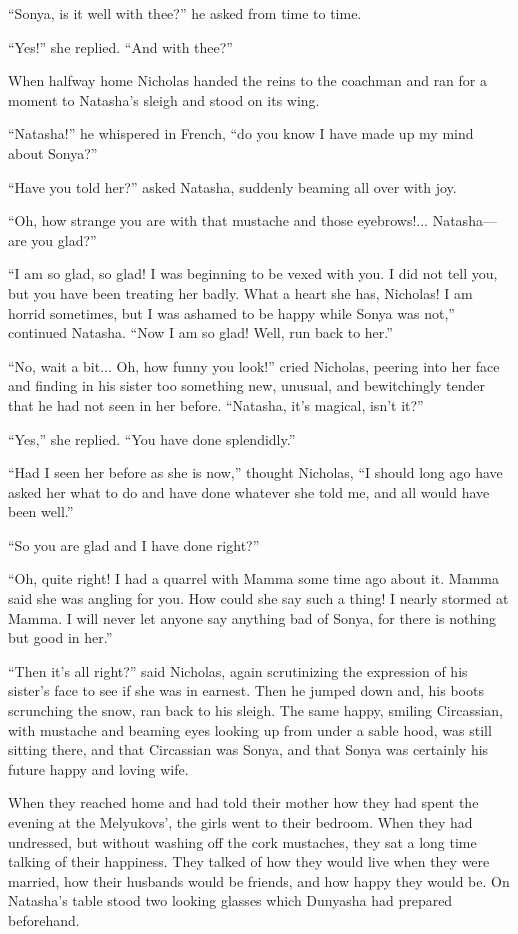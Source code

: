 ``Sonya, is it well with thee?'' he asked from time to time.

``Yes!'' she replied. ``And with thee?''

When halfway home Nicholas handed the reins to the coachman and
ran for a moment to Natasha's sleigh and stood on its wing.

``Natasha!'' he whispered in French, ``do you know I have made up
my mind about Sonya?''

``Have you told her?'' asked Natasha, suddenly beaming all over
with joy.

``Oh, how strange you are with that mustache and those
eyebrows!...  Natasha---are you glad?''

``I am so glad, so glad! I was beginning to be vexed with you. I
did not tell you, but you have been treating her badly. What a
heart she has, Nicholas! I am horrid sometimes, but I was ashamed
to be happy while Sonya was not,'' continued Natasha. ``Now I am
so glad! Well, run back to her.''

``No, wait a bit... Oh, how funny you look!'' cried Nicholas,
peering into her face and finding in his sister too something
new, unusual, and bewitchingly tender that he had not seen in her
before. ``Natasha, it's magical, isn't it?''

``Yes,'' she replied. ``You have done splendidly.''

``Had I seen her before as she is now,'' thought Nicholas, ``I
should long ago have asked her what to do and have done whatever
she told me, and all would have been well.''

``So you are glad and I have done right?''

``Oh, quite right! I had a quarrel with Mamma some time ago about
it.  Mamma said she was angling for you. How could she say such a
thing! I nearly stormed at Mamma. I will never let anyone say
anything bad of Sonya, for there is nothing but good in her.''

``Then it's all right?'' said Nicholas, again scrutinizing the
expression of his sister's face to see if she was in
earnest. Then he jumped down and, his boots scrunching the snow,
ran back to his sleigh. The same happy, smiling Circassian, with
mustache and beaming eyes looking up from under a sable hood, was
still sitting there, and that Circassian was Sonya, and that
Sonya was certainly his future happy and loving wife.

When they reached home and had told their mother how they had
spent the evening at the Melyukovs', the girls went to their
bedroom. When they had undressed, but without washing off the
cork mustaches, they sat a long time talking of their
happiness. They talked of how they would live when they were
married, how their husbands would be friends, and how happy they
would be. On Natasha's table stood two looking glasses which
Dunyasha had prepared beforehand.

